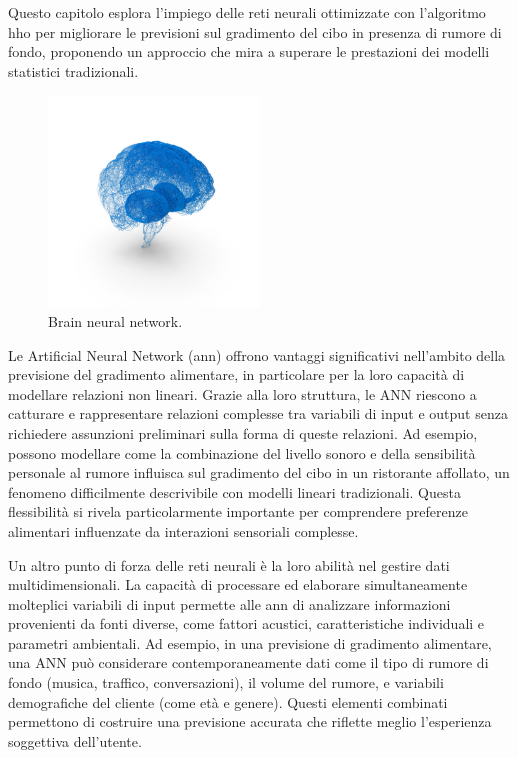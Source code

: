 \newpage

Questo capitolo esplora l'impiego delle reti neurali ottimizzate con l'algoritmo \gls{hho} per migliorare le previsioni sul gradimento del cibo in presenza di rumore di fondo, proponendo un approccio che mira a superare le prestazioni dei modelli statistici tradizionali.

\begin{figure}[H]
    \centering
    \includegraphics[width=0.5\textwidth]{Chapters/Figures/brain.png}
    \caption{\small Brain neural network. \cite{neural2024}}
    \label{fig:brain}
\end{figure}

Le Artificial Neural Network (\gls{ann}) offrono vantaggi significativi nell'ambito della previsione del gradimento alimentare, in particolare per la loro capacità di modellare relazioni non lineari. Grazie alla loro struttura, le ANN riescono a catturare e rappresentare relazioni complesse tra variabili di input e output senza richiedere assunzioni preliminari sulla forma di queste relazioni. Ad esempio, possono modellare come la combinazione del livello sonoro e della sensibilità personale al rumore influisca sul gradimento del cibo in un ristorante affollato, un fenomeno difficilmente descrivibile con modelli lineari tradizionali. Questa flessibilità si rivela particolarmente importante per comprendere preferenze alimentari influenzate da interazioni sensoriali complesse. \cite{PANAGOU2009121}

Un altro punto di forza delle reti neurali è la loro abilità nel gestire dati multidimensionali. La capacità di processare ed elaborare simultaneamente molteplici variabili di input permette alle \gls{ann} di analizzare informazioni provenienti da fonti diverse, come fattori acustici, caratteristiche individuali e parametri ambientali. Ad esempio, in una previsione di gradimento alimentare, una ANN può considerare contemporaneamente dati come il tipo di rumore di fondo (musica, traffico, conversazioni), il volume del rumore, e variabili demografiche del cliente (come età e genere). Questi elementi combinati permettono di costruire una previsione accurata che riflette meglio l'esperienza soggettiva dell'utente. \cite{YU201868}

